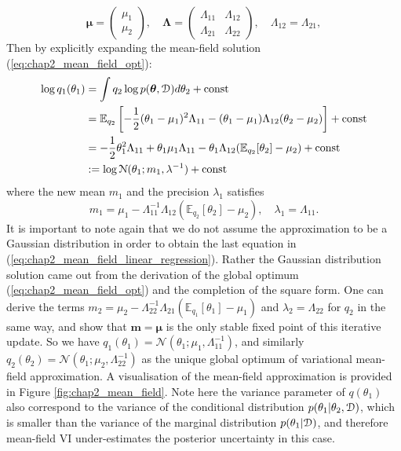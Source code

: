 \begin{equation*}
\bm{\mu} = \begin{pmatrix} \mu_1 \\ \mu_2 \end{pmatrix}, \quad
\bm{\Lambda} = \begin{pmatrix} \Lambda_{11} & \Lambda_{12} \\ \Lambda_{21} & \Lambda_{22} \end{pmatrix}, 
\quad \Lambda_{12} = \Lambda_{21},
\end{equation*}
Then by explicitly expanding the mean-field solution (\ref{eq:chap2_mean_field_opt}):
\begin{equation}
\begin{aligned}
\log q_1(\theta_1) &= \int q_2 \log p(\bm{\theta}, \mathcal{D}) d\theta_2 + \text{const} \\
&= \mathbb{E}_{q_2} \left[ -\frac{1}{2} (\theta_1 - \mu_1)^2 \Lambda_{11} - (\theta_1 - \mu_1) \Lambda_{12} (\theta_2 - \mu_2) \right] + \text{const} \\
&= -\frac{1}{2} \theta_1^2 \Lambda_{11} + \theta_1 \mu_1 \Lambda_{11} - \theta_1 \Lambda_{12} (\mathbb{E}_{q_2}[\theta_2] - \mu_2) + \text{const} \\
&:= \log \mathcal{N}(\theta_1; m_1, \lambda^{-1}) + \text{const}
\end{aligned}
\label{eq:chap2_mean_field_linear_regression}
\end{equation}
where the new mean $m_1$ and the precision $\lambda_1$ satisfies
\begin{equation*}
m_1 = \mu_1 - \Lambda_{11}^{-1}\Lambda_{12} (\mathbb{E}_{q_2}[\theta_2] - \mu_2), \quad
\lambda_1 = \Lambda_{11}.
\end{equation*}
It is important to note again that we do not assume the approximation to be a Gaussian distribution in order to obtain the last equation in (\ref{eq:chap2_mean_field_linear_regression}). Rather the Gaussian distribution solution came out from the derivation of the global optimum (\ref{eq:chap2_mean_field_opt}) and the completion of the square form.
%
One can derive the terms $m_2 = \mu_2 - \Lambda_{22}^{-1}\Lambda_{21} (\mathbb{E}_{q_1}[\theta_1] - \mu_1)$ and $\lambda_2 = \Lambda_{22}$ for $q_2$ in the same way, and show that $\bm{m} = \bm{\mu}$ is the only stable fixed point of this iterative update. So we have $q_1(\theta_1) = \mathcal{N}(\theta_1; \mu_1, \Lambda_{11}^{-1})$, and similarly $q_2(\theta_2) = \mathcal{N}(\theta_1; \mu_2, \Lambda_{22}^{-1})$ as the unique global optimum of variational mean-field approximation. A visualisation of the mean-field approximation is provided in Figure \ref{fig:chap2_mean_field}. Note here the variance parameter of $q(\theta_1)$ also correspond to the variance of the conditional distribution $p(\theta_1 | \theta_2, \mathcal{D})$, which is smaller than the variance of the marginal distribution $p(\theta_1 | \mathcal{D})$, and therefore mean-field VI under-estimates the posterior uncertainty in this case.


